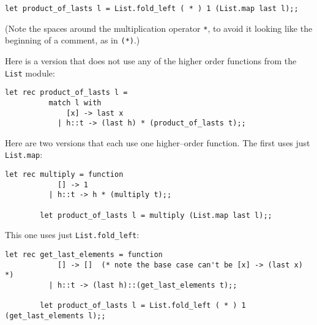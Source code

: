 \documentclass[11pt,fleqn]{article}
\begin{document}
\begin{enumerate}
\begin{Verbatim}[xleftmargin=10mm]
        let product_of_lasts l = List.fold_left ( * ) 1 (List.map last l);;
          \end{Verbatim}

          \vspace{-1mm}

          (Note the spaces around the multiplication operator \texttt{*}, to
          avoid it looking like the beginning of a comment, as in
          \texttt{(*)}.)

          Here is a version that does not use any of the higher order
          functions from the \texttt{List} module:

          \vspace{-2.5mm}

          \begin{Verbatim}[xleftmargin=10mm]
        let rec product_of_lasts l =
          match l with
              [x] -> last x
            | h::t -> (last h) * (product_of_lasts t);;
          \end{Verbatim}

          \vspace{-1mm}

          Here are two versions that each use one higher--order function.
          The first uses just \texttt{List.map}:

          \vspace{-2.5mm}

          \begin{Verbatim}[xleftmargin=10mm]
        let rec multiply = function
            [] -> 1
          | h::t -> h * (multiply t);;

        let product_of_lasts l = multiply (List.map last l);;
          \end{Verbatim}

          \vspace{-1mm}

          This one uses just \texttt{List.fold\_left}:

          \vspace{-2.5mm}

          \begin{Verbatim}[xleftmargin=10mm]
        let rec get_last_elements = function
            [] -> []  (* note the base case can't be [x] -> (last x) *)
          | h::t -> (last h)::(get_last_elements t);;

        let product_of_lasts l = List.fold_left ( * ) 1 (get_last_elements l);;
          \end{Verbatim}


\end{enumerate}
\end{document}
